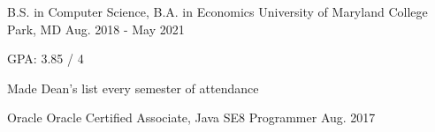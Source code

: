 

\begin{cventries}

  \cventry
    {B.S. in Computer Science, B.A. in Economics} %
    {University of Maryland} %
    {College Park, MD} %
    {Aug. 2018 - May 2021} %
    {
      \begin{cvitems} %
        \item {GPA: 3.85 / 4}
        \item {Made Dean's list every semester of attendance}
      \end{cvitems}
    }

    \cventry
    {Oracle} %
    {Oracle Certified Associate, Java SE8 Programmer} %
    {} %
    {Aug. 2017} %
    {
      \begin{cvitems} %
      \end{cvitems}
    }



\end{cventries}
